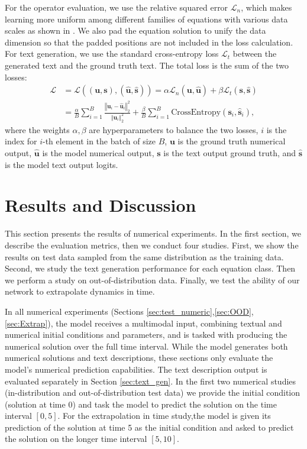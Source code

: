 \documentclass{article}
\providecommand{\norm}[1]{\left\Vert#1\right\Vert}
\begin{document}
For the operator evaluation, we use the relative squared error $\mathcal{L}_n$, which makes learning more uniform among different families of equations with various data scales as shown in \cite{jadon2024comprehensive}. We also pad the equation solution to unify the data dimension so that the padded positions are not included in the loss calculation. For text generation, we use the standard cross-entropy loss $\mathcal{L}_t$ between the generated text and the ground truth text. The total loss is the sum of the two losses:
\begin{align*}
    \mathcal{L} &= \mathcal{L}((\bm{u}, \bm{s}), (\hat{\bm{u}}, \hat{\bm{s}}))= \alpha \mathcal{L}_n(\bm{u}, \hat{\bm{u}}) + \beta \mathcal{L}_t(\bm{s}, \hat{\bm{s}})\\
    &= \frac{\alpha}{B}\sum_{i=1}^B \frac{\norm{\bm{u}_i - \hat{\bm{u}}_i}_2^2}{\norm{\bm{u}_i}_2^2} + \frac{\beta}{B}\sum_{i=1}^B \text{CrossEntropy}(\bm{s}_i, \hat{\bm{s}}_i),
\end{align*}
where the weights $\alpha,\beta$ are hyperparameters to balance the two losses, $i$ is the index for $i$-th element in the batch of size $B$, $\bm{u}$ is the ground truth numerical output, $\hat{\bm{u}}$ is the model numerical output, $\bm{s}$ is the text output ground truth, and $\hat{\bm{s}}$ is the model text output logits. 



\section{Results and Discussion}\label{sec:results}
This section presents the results of numerical experiments. In the first section, we describe the evaluation metrics, then we conduct four studies. First, we show the results on test data sampled from the same distribution as the training data. Second, we study the text generation performance for each equation class. Then we perform a study on out-of-distribution data. Finally,  we test the ability of our network to extrapolate dynamics in time. 

In all numerical experiments (Sections \ref{sec:test_numeric},\ref{sec:OOD}, \ref{sec:Extrap}), the model receives a multimodal input, combining textual and numerical initial conditions and parameters, and is tasked with producing the numerical solution over the full time interval. While the model generates both numerical solutions and text descriptions, these sections only evaluate the model's numerical prediction capabilities. The text description output is evaluated separately in Section \ref{sec:text_gen}. In the first two numerical studies (in-distribution and out-of-distribution test data) we provide the initial condition (solution at time 0) and task the model to predict the solution on the time interval $[0,5]$. For the extrapolation in time study,the model is given its prediction of the solution at time 5 as the initial condition and asked to predict the solution on the longer time interval $[5,10]$. 
\end{document}
